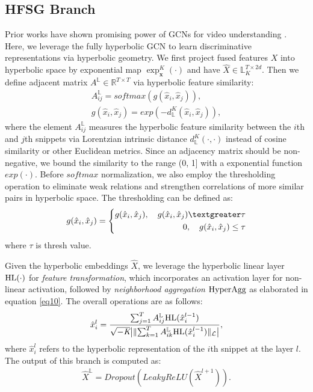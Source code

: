 \documentclass[sigconf]{acmart}
\newcommand{\Lc}{\mathcal{L}}
\newcommand{\lnorm}[1]{\lVert #1\rVert_\Lc}
\newcommand{\expmap}[2]{\exp_\mathbf{#1}^K(\mathbf{#2})}
\begin{document}
\subsection{HFSG Branch}
Prior works have shown promising power of GCNs for video understanding \cite{Wang_Gupta_2018, c:3, Zeng_Huang_Tan_Rong_Zhao_Huang_Gan_2019, c:2}. Here, we leverage the fully hyperbolic GCN to learn discriminative representations via hyperbolic geometry. We first project fused features $X$ into hyperbolic space by exponential map $\expmap{x}{\cdot}$ and have $\hat{X}\in \mathbb{L}_{K}^{T\times 2d}$. Then we define adjacent matrix $A^{\mathbb{L}} \in \mathbb{R}^{T \times T}$ via hyperbolic feature similarity:
\begin{align}
\label{eq11}
    A_{ij}^{\mathbb{L}} = softmax(g(\hat{x}_i, \hat{x}_j)),\\
\label{eq12}
    g(\hat{x}_i, \hat{x}_j)= exp(-d_{\mathbb{L}}^{K}(\hat{x}_i, \hat{x}_j)),
\end{align}
where the element $A_{ij}^{\mathbb{L}}$ measures the hyperbolic feature similarity between the $i$th and $j$th snippets via Lorentzian intrinsic distance $d_{\mathbb{L}}^{K}(\cdot,\cdot)$ instead of cosine similarity or other Euclidean metrics. Since an adjacency matrix should be non-negative, we bound the similarity to the range (0, 1] with a exponential function $exp(\cdot)$. Before $softmax$ normalization, we also employ the thresholding operation to eliminate weak relations and strengthen correlations of more similar pairs in hyperbolic space. The thresholding can be defined as:
\begin{equation}
\label{eq13}
  g(\hat{x}_i, \hat{x}_j) = \left\{
	\begin{aligned}
	g(\hat{x}_i, \hat{x}_j), \quad g(\hat{x}_i, \hat{x}_j)\textgreater\tau \\
	0, \quad g(\hat{x}_i, \hat{x}_j)\leq\tau \\ 
	\end{aligned}
	\right.
\end{equation}
where $\tau$ is thresh value.

Given the hyperbolic embeddings $\hat{X}$, we leverage the hyperbolic linear layer $\rm{HL}(\cdot)$ for \emph{feature transformation}, which incorporates an activation layer for non-linear activation, followed by \emph{neighborhood aggregation} $\rm{HyperAgg}$ as elaborated in equation \ref{eq10}. The overall operations are as follows: 
\begin{align}
\label{eq14}
   \hat{x}_{i}^{l} = \frac{\sum_{j=1}^{T}A_{ij}^{\mathbb{L}} {\rm HL}( \hat{x}_{i}^{l-1}) }{\sqrt{-\textit{K}} \big | \lnorm{\sum_{k=1}^{T}A_{ik}^{\mathbb{L}} {\rm HL}(\hat{x}_{i}^{l-1}) } \big|}  ,   
\end{align}
where $\hat{x}_{i}^{l}$ refers to the hyperbolic representation of the $i$th snippet at the layer $l$. The output of this branch is computed as:
\begin{align}
\label{eq15}
    \hat{X}^{\mathbb{L}} = Dropout(LeakyReLU(\hat{X}^{l+1})).
\end{align}
\end{document}
